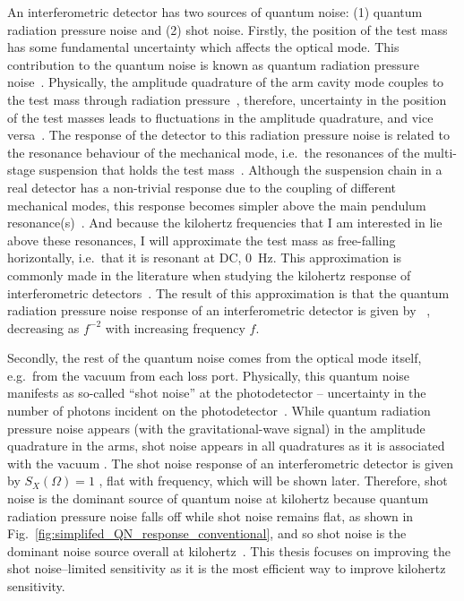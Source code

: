 An interferometric detector has two sources of quantum noise: (1) quantum radiation pressure noise and (2) shot noise. 
Firstly, the position of the test mass has some fundamental uncertainty which affects the optical mode. %
This contribution to the quantum noise is known as quantum radiation pressure noise~\cite{}. 
Physically, the amplitude quadrature of the arm cavity mode couples to the test mass through radiation pressure~\cite{}, therefore, uncertainty in the position of the test masses leads to fluctuations in the amplitude quadrature, and vice versa~\cite{Danilishin?}. The response of the detector to this radiation pressure noise is related to the resonance behaviour of the mechanical mode, i.e.\ the resonances of the multi-stage suspension that holds the test mass~\cite{}. Although the suspension chain in a real detector has a non-trivial response due to the coupling of different mechanical modes, this response becomes simpler above the main pendulum resonance(s)~\cite{}. And because the kilohertz frequencies that I am interested in lie above these resonances, I will approximate the test mass as free-falling horizontally, i.e.\ that it is resonant at DC, $0$~Hz. This approximation is commonly made in the literature when studying the kilohertz response of interferometric detectors~\cite{}. The result of this approximation is that the quantum radiation pressure noise response of an interferometric detector is given by ~\cite{}, decreasing as $f^{-2}$ with increasing frequency $f$.

Secondly, the rest of the quantum noise comes from the optical mode itself, e.g.\ from the vacuum from each loss port. Physically, this quantum noise manifests as so-called ``shot noise'' at the photodetector -- uncertainty in the number of photons incident on the photodetector~\cite{}. While quantum radiation pressure noise appears (with the gravitational-wave signal) in the amplitude quadrature in the arms, shot noise appears in all quadratures as it is associated with the vacuum . The shot noise response of an interferometric detector is given by $S_X(\Omega) = 1$ , flat with frequency, which will be shown later. Therefore, shot noise is the dominant source of quantum noise at kilohertz because quantum radiation pressure noise falls off while shot noise remains flat, as shown in Fig.~\ref{fig:simplifed_QN_response_conventional}, and so shot noise is the dominant noise source overall at kilohertz~\cite{}. This thesis focuses on improving the shot noise--limited sensitivity as it is the most efficient way to improve kilohertz sensitivity. 


